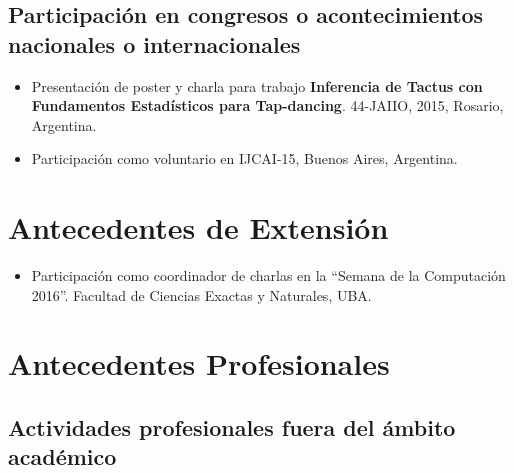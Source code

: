 \documentclass[a4paper,10pt]{article}
\begin{document}
\subsection{Participación en congresos o acontecimientos nacionales o
internacionales}

\begin{itemize}
    \item Presentación de poster y charla para trabajo 
\textbf{Inferencia de Tactus con Fundamentos Estadísticos para
Tap-dancing}.
        44-JAIIO, 2015, Rosario, Argentina.
    \item Participación como voluntario en IJCAI-15, Buenos Aires, Argentina.
\end{itemize}

\section{Antecedentes de Extensión}

\begin{itemize}
    \item Participación como coordinador de charlas en la “Semana de la
        Computación 2016”. Facultad de Ciencias Exactas y Naturales, UBA. 
\end{itemize}

\section{Antecedentes Profesionales}

\subsection{Actividades profesionales fuera del ámbito académico}
\end{document}
